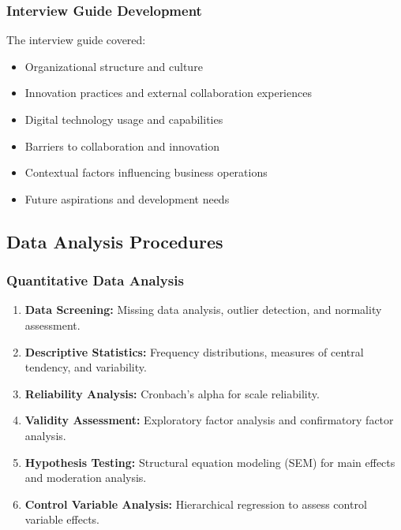 \subsubsection{Interview Guide Development}
The interview guide covered:
\begin{itemize}
    \item Organizational structure and culture
    \item Innovation practices and external collaboration experiences
    \item Digital technology usage and capabilities
    \item Barriers to collaboration and innovation
    \item Contextual factors influencing business operations
    \item Future aspirations and development needs
\end{itemize}

\subsection{Data Analysis Procedures}

\subsubsection{Quantitative Data Analysis}
\begin{enumerate}
    \item \textbf{Data Screening:} Missing data analysis, outlier detection, and normality assessment.
    \item \textbf{Descriptive Statistics:} Frequency distributions, measures of central tendency, and variability.
    \item \textbf{Reliability Analysis:} Cronbach's alpha for scale reliability.
    \item \textbf{Validity Assessment:} Exploratory factor analysis and confirmatory factor analysis.
    \item \textbf{Hypothesis Testing:} Structural equation modeling (SEM) for main effects and moderation analysis.
    \item \textbf{Control Variable Analysis:} Hierarchical regression to assess control variable effects.
\end{enumerate}

